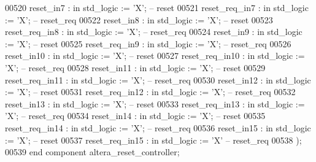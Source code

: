 \begin{DoxyCode}
00520             reset\_in7      : \textcolor{keywordflow}{in}  \textcolor{comment}{std\_logic} := 'X'; \textcolor{keyword}{-- reset}
00521             reset\_req\_in7  : \textcolor{keywordflow}{in}  \textcolor{comment}{std\_logic} := 'X'; \textcolor{keyword}{-- reset\_req}
00522             reset\_in8      : \textcolor{keywordflow}{in}  \textcolor{comment}{std\_logic} := 'X'; \textcolor{keyword}{-- reset}
00523             reset\_req\_in8  : \textcolor{keywordflow}{in}  \textcolor{comment}{std\_logic} := 'X'; \textcolor{keyword}{-- reset\_req}
00524             reset\_in9      : \textcolor{keywordflow}{in}  \textcolor{comment}{std\_logic} := 'X'; \textcolor{keyword}{-- reset}
00525             reset\_req\_in9  : \textcolor{keywordflow}{in}  \textcolor{comment}{std\_logic} := 'X'; \textcolor{keyword}{-- reset\_req}
00526             reset\_in10     : \textcolor{keywordflow}{in}  \textcolor{comment}{std\_logic} := 'X'; \textcolor{keyword}{-- reset}
00527             reset\_req\_in10 : \textcolor{keywordflow}{in}  \textcolor{comment}{std\_logic} := 'X'; \textcolor{keyword}{-- reset\_req}
00528             reset\_in11     : \textcolor{keywordflow}{in}  \textcolor{comment}{std\_logic} := 'X'; \textcolor{keyword}{-- reset}
00529             reset\_req\_in11 : \textcolor{keywordflow}{in}  \textcolor{comment}{std\_logic} := 'X'; \textcolor{keyword}{-- reset\_req}
00530             reset\_in12     : \textcolor{keywordflow}{in}  \textcolor{comment}{std\_logic} := 'X'; \textcolor{keyword}{-- reset}
00531             reset\_req\_in12 : \textcolor{keywordflow}{in}  \textcolor{comment}{std\_logic} := 'X'; \textcolor{keyword}{-- reset\_req}
00532             reset\_in13     : \textcolor{keywordflow}{in}  \textcolor{comment}{std\_logic} := 'X'; \textcolor{keyword}{-- reset}
00533             reset\_req\_in13 : \textcolor{keywordflow}{in}  \textcolor{comment}{std\_logic} := 'X'; \textcolor{keyword}{-- reset\_req}
00534             reset\_in14     : \textcolor{keywordflow}{in}  \textcolor{comment}{std\_logic} := 'X'; \textcolor{keyword}{-- reset}
00535             reset\_req\_in14 : \textcolor{keywordflow}{in}  \textcolor{comment}{std\_logic} := 'X'; \textcolor{keyword}{-- reset\_req}
00536             reset\_in15     : \textcolor{keywordflow}{in}  \textcolor{comment}{std\_logic} := 'X'; \textcolor{keyword}{-- reset}
00537             reset\_req\_in15 : \textcolor{keywordflow}{in}  \textcolor{comment}{std\_logic} := 'X'  \textcolor{keyword}{-- reset\_req}
00538         );
00539     \textcolor{keywordflow}{end} \textcolor{keywordflow}{component} \textcolor{vhdlchar}{altera_reset_controller};

\end{DoxyCode}
